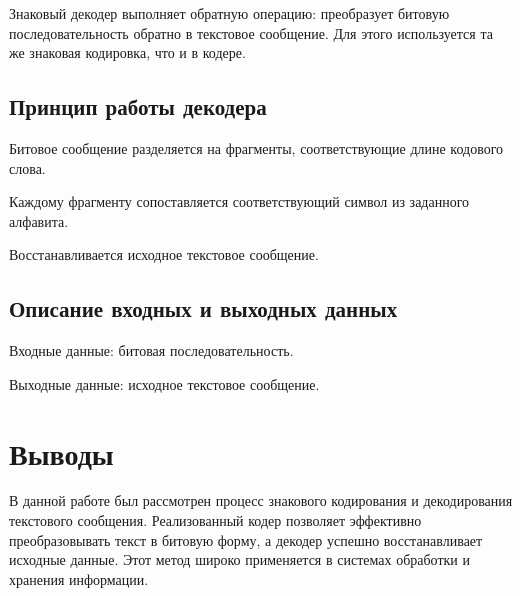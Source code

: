 Знаковый декодер выполняет обратную операцию: преобразует битовую последовательность обратно в текстовое сообщение. Для этого используется та же знаковая кодировка, что и в кодере.

\subsection{Принцип работы декодера}

Битовое сообщение разделяется на фрагменты, соответствующие длине кодового слова.

Каждому фрагменту сопоставляется соответствующий символ из заданного алфавита.

Восстанавливается исходное текстовое сообщение.

\subsection{Описание входных и выходных данных}

Входные данные: битовая последовательность.

Выходные данные: исходное текстовое сообщение.

\section{Выводы}

В данной работе был рассмотрен процесс знакового кодирования и декодирования текстового сообщения. Реализованный кодер позволяет эффективно преобразовывать текст в битовую форму, а декодер успешно восстанавливает исходные данные. Этот метод широко применяется в системах обработки и хранения информации.